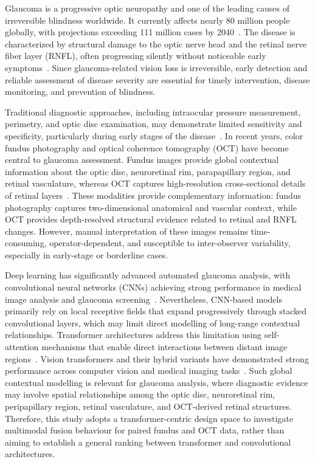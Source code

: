 \documentclass[preprint,12pt]{elsarticle}
\begin{document}
Glaucoma is a progressive optic neuropathy and one of the leading causes of irreversible blindness worldwide. It currently affects nearly 80 million people globally, with projections exceeding 111 million cases by 2040~\cite{tham2014global}. The disease is characterized by structural damage to the optic nerve head and the retinal nerve fiber layer (RNFL), often progressing silently without noticeable early symptoms~\cite{mcmonnies2017glaucoma}. Since glaucoma-related vision loss is irreversible, early detection and reliable assessment of disease severity are essential for timely intervention, disease monitoring, and prevention of blindness.

Traditional diagnostic approaches, including intraocular pressure measurement, perimetry, and optic disc examination, may demonstrate limited sensitivity and specificity, particularly during early stages of the disease~\cite{Shan2024,jayaram2023glaucoma}. In recent years, color fundus photography and optical coherence tomography (OCT) have become central to glaucoma assessment. Fundus images provide global contextual information about the optic disc, neuroretinal rim, parapapillary region, and retinal vasculature, whereas OCT captures high-resolution cross-sectional details of retinal layers~\cite{kanski10}. These modalities provide complementary information: fundus photography captures two-dimensional anatomical and vascular context, while OCT provides depth-resolved structural evidence related to retinal and RNFL changes. However, manual interpretation of these images remains time-consuming, operator-dependent, and susceptible to inter-observer variability, especially in early-stage or borderline cases.

Deep learning has significantly advanced automated glaucoma analysis, with convolutional neural networks (CNNs) achieving strong performance in medical image analysis and glaucoma screening~\cite{cho2021deep,shyamalee2022attention}. Nevertheless, CNN-based models primarily rely on local receptive fields that expand progressively through stacked convolutional layers, which may limit direct modelling of long-range contextual relationships. Transformer architectures address this limitation using self-attention mechanisms that enable direct interactions between distant image regions~\cite{henry2022vision}. Vision transformers and their hybrid variants have demonstrated strong performance across computer vision and medical imaging tasks~\cite{fan2023detecting}. Such global contextual modelling is relevant for glaucoma analysis, where diagnostic evidence may involve spatial relationships among the optic disc, neuroretinal rim, peripapillary region, retinal vasculature, and OCT-derived retinal structures. Therefore, this study adopts a transformer-centric design space to investigate multimodal fusion behaviour for paired fundus and OCT data, rather than aiming to establish a general ranking between transformer and convolutional architectures.
\end{document}

